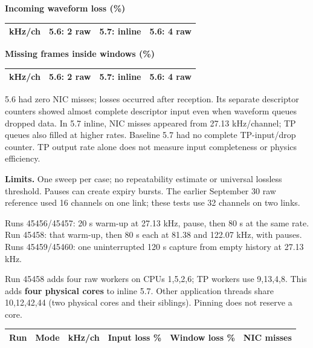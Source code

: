 \documentclass[10pt,a4paper]{article}
\newcommand{\heading}[1]{\par\vspace{5pt}{\large\bfseries #1}\par\vspace{2pt}}
\begin{document}
\begin{minipage}[t]{0.49\linewidth}
\textbf{Incoming waveform loss (\%)}\par
\small
\begin{tabular}{@{}rrrr@{}}\toprule
kHz/ch & 5.6: 2 raw & 5.7: inline & 5.6: 4 raw \\\midrule

\end{tabular}
\end{minipage}\hfill
\begin{minipage}[t]{0.49\linewidth}
\textbf{Missing frames inside windows (\%)}\par
\small
\begin{tabular}{@{}rrrr@{}}\toprule
kHz/ch & 5.6: 2 raw & 5.7: inline & 5.6: 4 raw \\\midrule

\end{tabular}
\end{minipage}

5.6 had zero NIC misses; losses occurred after reception. Its separate descriptor counters showed almost complete descriptor input even when waveform queues dropped data. In 5.7 inline, NIC misses appeared from 27.13 kHz/channel; TP queues also filled at higher rates. Baseline 5.7 had no complete TP-input/drop counter. TP output rate alone does not measure input completeness or physics efficiency.

\textbf{Limits.} One sweep per case; no repeatability estimate or universal lossless threshold. Pauses can create expiry bursts. The earlier September 30 raw reference used 16 channels on one link; these tests use 32 channels on two links.

\newpage
\heading{3. Timing and four-worker experiments in 5.7}
Runs 45456/45457: 20 s warm-up at 27.13 kHz, pause, then 80 s at the same rate. Run 45458: that warm-up, then 80 s each at 81.38 and 122.07 kHz, with pauses. Runs 45459/45460: one uninterrupted 120 s capture from empty history at 27.13 kHz.

Run 45458 adds four raw workers on CPUs 1,5,2,6; TP workers use 9,13,4,8. This adds \textbf{four physical cores} to inline 5.7. Other application threads share 10,12,42,44 (two physical cores and their siblings). Pinning does not reserve a core.

{\small\begin{tabularx}{\linewidth}{@{}rYrrrr@{}}\toprule
Run & Mode & kHz/ch & Input loss \% & Window loss \% & NIC misses \\\midrule

\end{tabularx}}
\end{document}
